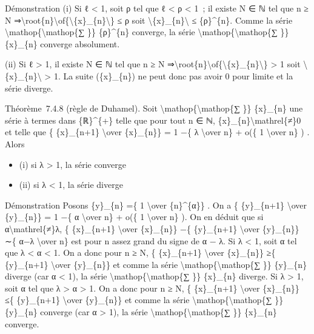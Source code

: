 \documentclass[]{article}
\begin{document}
Démonstration (i) Si ℓ \textless{} 1, soit ρ tel que ℓ \textless{} ρ
\textless{} 1~; il existe N ∈ ℕ tel que n ≥ N
⇒\textbackslash{}root\{n\}\textbackslash{}of\{\textbackslash{}\textbar{}\{x\}\_\{n\}\textbackslash{}\textbar{}\}
≤ ρ soit
\textbackslash{}\textbar{}\{x\}\_\{n\}\textbackslash{}\textbar{} ≤
\{ρ\}\^{}\{n\}. Comme la série
\textbackslash{}mathop\{\textbackslash{}mathop\{∑ \}\} \{ρ\}\^{}\{n\}
converge, la série \textbackslash{}mathop\{\textbackslash{}mathop\{∑
\}\} \{x\}\_\{n\} converge absolument.

(ii) Si ℓ \textgreater{} 1, il existe N ∈ ℕ tel que n ≥ N
⇒\textbackslash{}root\{n\}\textbackslash{}of\{\textbackslash{}\textbar{}\{x\}\_\{n\}\textbackslash{}\textbar{}\}
\textgreater{} 1 soit
\textbackslash{}\textbar{}\{x\}\_\{n\}\textbackslash{}\textbar{}
\textgreater{} 1. La suite (\{x\}\_\{n\}) ne peut donc pas avoir 0 pour
limite et la série diverge.

Théorème~7.4.8 (règle de Duhamel). Soit
\textbackslash{}mathop\{\textbackslash{}mathop\{∑ \}\} \{x\}\_\{n\} une
série à termes dans \{ℝ\}\^{}\{+\} telle que pour tout n ∈ ℕ,
\{x\}\_\{n\}\textbackslash{}mathrel\{≠\}0 et telle que \{ \{x\}\_\{n+1\}
\textbackslash{}over \{x\}\_\{n\}\} = 1 −\{ λ \textbackslash{}over n\} +
o(\{ 1 \textbackslash{}over n\} ) . Alors

\begin{itemize}
\itemsep1pt\parskip0pt
\item
  (i) si λ \textgreater{} 1, la série converge
\item
  (ii) si λ \textless{} 1, la série diverge
\end{itemize}

Démonstration Posons \{y\}\_\{n\} =\{ 1 \textbackslash{}over
\{n\}\^{}\{α\}\} . On a \{ \{y\}\_\{n+1\} \textbackslash{}over
\{y\}\_\{n\}\} = 1 −\{ α \textbackslash{}over n\} + o(\{ 1
\textbackslash{}over n\} ). On en déduit que si
α\textbackslash{}mathrel\{≠\}λ, \{ \{x\}\_\{n+1\} \textbackslash{}over
\{x\}\_\{n\}\} −\{ \{y\}\_\{n+1\} \textbackslash{}over \{y\}\_\{n\}\}
∼\{ α−λ \textbackslash{}over n\} est pour n assez grand du signe de α −
λ. Si λ \textless{} 1, soit α tel que λ \textless{} α \textless{} 1. On
a donc pour n ≥ N, \{ \{x\}\_\{n+1\} \textbackslash{}over \{x\}\_\{n\}\}
≥\{ \{y\}\_\{n+1\} \textbackslash{}over \{y\}\_\{n\}\} et comme la série
\textbackslash{}mathop\{\textbackslash{}mathop\{∑ \}\} \{y\}\_\{n\}
diverge (car α \textless{} 1), la série
\textbackslash{}mathop\{\textbackslash{}mathop\{∑ \}\} \{x\}\_\{n\}
diverge. Si λ \textgreater{} 1, soit α tel que λ \textgreater{} α
\textgreater{} 1. On a donc pour n ≥ N, \{ \{x\}\_\{n+1\}
\textbackslash{}over \{x\}\_\{n\}\} ≤\{ \{y\}\_\{n+1\}
\textbackslash{}over \{y\}\_\{n\}\} et comme la série
\textbackslash{}mathop\{\textbackslash{}mathop\{∑ \}\} \{y\}\_\{n\}
converge (car α \textgreater{} 1), la série
\textbackslash{}mathop\{\textbackslash{}mathop\{∑ \}\} \{x\}\_\{n\}
converge.
\end{document}
